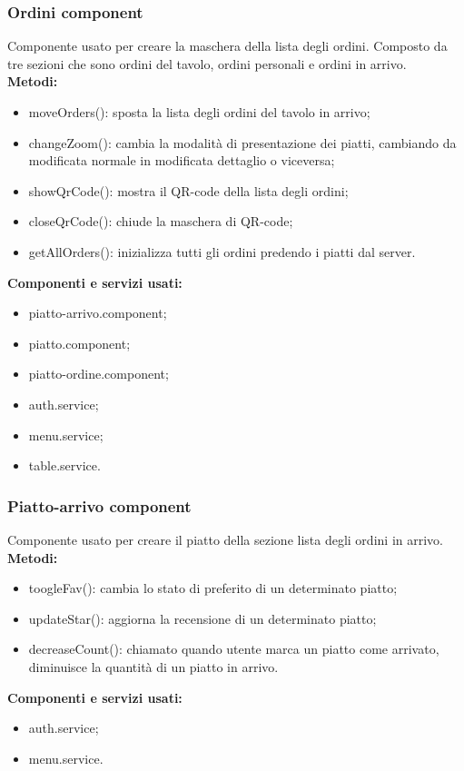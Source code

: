 \subsubsection{Ordini component}
Componente usato per creare la maschera della lista degli ordini. Composto da tre sezioni che sono ordini del tavolo, ordini personali e ordini in arrivo.\\
\textbf{Metodi:}
\begin{itemize}
    \item moveOrders(): sposta la lista degli ordini del tavolo in arrivo;
    \item changeZoom(): cambia la modalità di presentazione dei piatti, cambiando da modificata normale in modificata dettaglio o viceversa;
    \item showQrCode(): mostra il QR-code della lista degli ordini;
    \item closeQrCode(): chiude la maschera di QR-code;
    \item getAllOrders(): inizializza tutti gli ordini predendo i piatti dal server.
\end{itemize}
\textbf{Componenti e servizi usati:}
\begin{itemize}
    \item piatto-arrivo.component;
    \item piatto.component;
    \item piatto-ordine.component;
    \item auth.service;
    \item menu.service;
    \item table.service.
\end{itemize}

\subsubsection{Piatto-arrivo component}
Componente usato per creare il piatto della sezione lista degli ordini in arrivo.\\
\textbf{Metodi:}
\begin{itemize}
    \item toogleFav(): cambia lo stato di preferito di un determinato piatto;
    \item updateStar(): aggiorna la recensione di un determinato piatto;
    \item decreaseCount(): chiamato quando utente marca un piatto come arrivato, diminuisce la quantità di un piatto in arrivo.
\end{itemize}
\textbf{Componenti e servizi usati:}
\begin{itemize}
    \item auth.service;
    \item menu.service.
\end{itemize}

